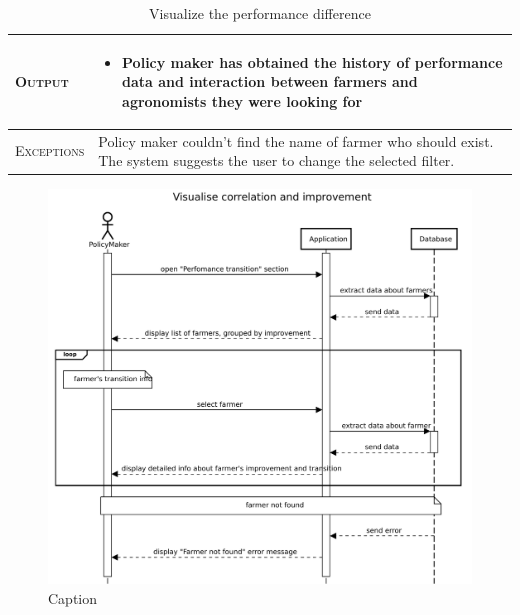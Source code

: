 \begin{table}[H]
\begin{tabular}{|l|p{}|}
    	\hline %
    	\textsc{Output}             &  \begin{itemize}
    	    \item Policy maker has obtained the history of performance data and interaction between farmers and agronomists they were looking for
    	\end{itemize}\\
    	\hline %
    	\textsc{Exceptions}         &  Policy maker couldn’t find the name of farmer who should exist. The system suggests the user to change the selected filter.\\
    	\hline %
        
    \end{tabular}
    \caption{\label{tab:visualize_iprovement}Visualize the performance difference} %
\end{table}

\begin{figure}[H]
    \centering
    \includegraphics[scale=0.5]{Images/Sequence diagrams/PolicyMaker - visualise correlation and improvement.pdf}
    \caption{Caption}
    \label{fig:my_label}
\end{figure}

